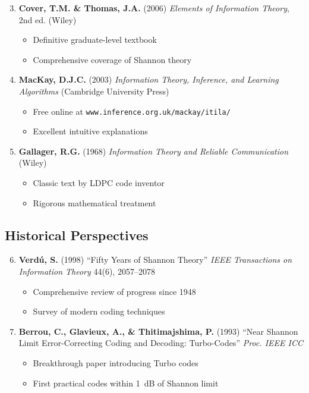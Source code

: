 \begin{enumerate}
\setcounter{enumi}{2}
\item \textbf{Cover, T.M. \& Thomas, J.A.} (2006) \textit{Elements of Information Theory}, 2nd ed. (Wiley)
  \begin{itemize}
  \item Definitive graduate-level textbook
  \item Comprehensive coverage of Shannon theory
  \end{itemize}

\item \textbf{MacKay, D.J.C.} (2003) \textit{Information Theory, Inference, and Learning Algorithms} (Cambridge University Press)
  \begin{itemize}
  \item Free online at \texttt{www.inference.org.uk/mackay/itila/}
  \item Excellent intuitive explanations
  \end{itemize}

\item \textbf{Gallager, R.G.} (1968) \textit{Information Theory and Reliable Communication} (Wiley)
  \begin{itemize}
  \item Classic text by LDPC code inventor
  \item Rigorous mathematical treatment
  \end{itemize}
\end{enumerate}

\subsection{Historical Perspectives}

\begin{enumerate}
\setcounter{enumi}{5}
\item \textbf{Verdú, S.} (1998) ``Fifty Years of Shannon Theory'' \textit{IEEE Transactions on Information Theory} 44(6), 2057--2078
  \begin{itemize}
  \item Comprehensive review of progress since 1948
  \item Survey of modern coding techniques
  \end{itemize}

\item \textbf{Berrou, C., Glavieux, A., \& Thitimajshima, P.} (1993) ``Near Shannon Limit Error-Correcting Coding and Decoding: Turbo-Codes'' \textit{Proc. IEEE ICC}
  \begin{itemize}
  \item Breakthrough paper introducing Turbo codes
  \item First practical codes within 1~dB of Shannon limit
  \end{itemize}
\end{enumerate}
